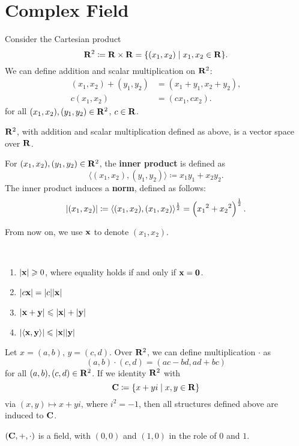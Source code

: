 \section{Complex Field}
Consider the Cartesian product
\[\mathbf R^2\coloneqq\mathbf R\times\mathbf R=\{(x_1,x_2)\mid x_1,x_2\in\mathbf R\}.\]
We can define addition and scalar multiplication on $\mathbf R^2$:
\begin{align*}
(x_1,x_2)+(y_1,y_2)&=(x_1+y_1,x_2+y_2),\\
c(x_1,x_2)&=(cx_1,cx_2).
\end{align*}
for all $(x_1,x_2),(y_1,y_2)\in\mathbf R^2$, $c\in\mathbf R$.

\begin{proposition}
$\mathbf R^2$, with addition and scalar multiplication defined as above, is a vector space over $\mathbf R$.
\end{proposition}

For $(x_1,x_2),(y_1,y_2)\in\mathbf R^2$, the \textbf{inner product} is defined as 
\[\langle(x_1,x_2),(y_1,y_2)\rangle\coloneqq x_1y_1+x_2y_2.\]
The inner product induces a \textbf{norm}, defined as follows:
\[|(x_1,x_2)|\coloneqq\langle(x_1,x_2),(x_1,x_2)\rangle^\frac{1}{2}=\left({x_1}^2+{x_2}^2\right)^\frac{1}{2}. \]
\begin{notation}
From now on, we use $\vb{x}$ to denote $(x_1,x_2)$.
\end{notation}

\begin{proposition} \
\begin{enumerate}[label=(\arabic*)]
\item $|\vb{x}|\geqslant0$, where equality holds if and only if $\vb{x}=\vb{0}$.
\item $|c\vb{x}|=|c||\vb{x}|$
\item $|\vb{x}+\vb{y}|\leqslant|\vb{x}|+|\vb{y}|$
\item $|\langle\vb{x},\vb{y}\rangle|\leqslant|\vb{x}||\vb{y}|$
\end{enumerate}
\end{proposition}

Let $x=(a,b)$, $y=(c,d)$. Over $\mathbf R^2$, we can define multiplication $\cdot$ as
\[(a,b)\cdot(c,d)=(ac-bd,ad+bc)\]
for all $(a,b),(c,d)\in\mathbf R^2$. If we identity $\mathbf R^2$ with
\[\mathbf C\coloneqq\{x+yi\mid x,y\in\mathbf R\}\]
via $(x,y)\mapsto x+yi$, where $i^2=-1$, then all structures defined above are induced to $\mathbf C$.

\begin{proposition}
$(\mathbf C,+,\cdot)$ is a field, with $(0,0)$ and $(1,0)$ in the role of $0$ and $1$.
\end{proposition}

